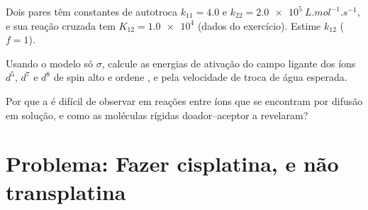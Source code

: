 \begin{exercise}[$\star\star\star$]\label{exo:b3:complex-mechanisms:10}
Dois pares têm constantes de autotroca $k_{11} = 4.0$ e $k_{22} = \qty{2.0e5}{L.mol^{-1}.s^{-1}}$, e
sua reação cruzada tem $K_{12} = \num{1.0e4}$ (dados do exercício). Estime $k_{12}$ ($f = 1$).
\end{exercise}

\begin{exercise}[$\star\star\star$]\label{exo:b3:complex-mechanisms:11}
Usando o modelo só $\sigma$, calcule as energias de ativação do campo ligante dos
íons $d^5$, $d^7$ e $d^8$ de spin alto e ordene ,  e  pela
velocidade de troca de água esperada.
\end{exercise}

\begin{exercise}[$\star\star\star$]\label{exo:b3:complex-mechanisms:12}
Por que a  é difícil de observar em reações entre íons que se
encontram por difusão em solução, e como as moléculas rígidas doador--aceptor a
revelaram?
\end{exercise}

\section{Problema: Fazer cisplatina, e não transplatina}

